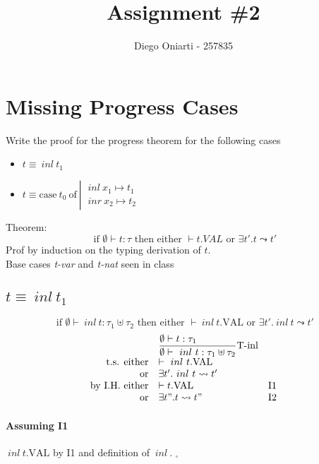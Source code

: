 \documentclass{article}
\title{Assignment \#2}
\author{Diego Oniarti - 257835}
\date{}
\newcommand{\st}[3][]{\ensuremath{\displaystyle\frac{#3\hfill}{#2\hfill} \text{#1}}}
\newcommand{\inl}[0]{\ensuremath{\ inl\ }}
\newcommand{\inr}[0]{\ensuremath{\ inr\ }}
\newcommand{\case}[3]{\ensuremath{\text{case}\ #1\ \text{of}\ \left|\begin{aligned}#2\\#3\end{aligned}\right.}}
\begin{document}
\maketitle

\section{Missing Progress Cases}
Write the proof for the progress theorem for the following cases
\begin{itemize}
    \item $t \equiv \inl t_1$
    \item $t \equiv \case{t_0}{\inl x_1 \mapsto t_1}{\inr x_2 \mapsto t_2}$
\end{itemize}

Theorem:
\[
    \text{ if } \emptyset \vdash t:\tau \text{ then either } \vdash t.VAL \text{ or } \exists t'.t\leadsto t'
\] 
Prof by induction on the typing derivation of $t$.\\
Base cases \textit{t-var} and \textit{t-nat} seen in class

\subsection{$t \equiv \inl t_1$}
\[
    \text{ if } \emptyset \vdash \inl t:\tau_1\uplus\tau_2 \text{ then either } \vdash \inl t.\text{VAL} \text{ or } \exists t'.\inl t\leadsto t'
\] 
\[
    \begin{array}{rl @{\quad} l}
                             &  \st[T-inl]{\emptyset\vdash \inl t: \tau_1\uplus\tau_2}{\emptyset\vdash t:\tau_1}  \\
        \text{t.s. either}   &   \vdash \inl t.\text{VAL} \\
        \text{or}            &   \exists t'.\inl t \leadsto t' \\
        \text{by I.H. either}&   \vdash t.\text{VAL}                 & \text{I1} \\
        \text{or}            &   \exists t".t \leadsto t"            & \text{I2} \\
    \end{array}
\]

\paragraph{Assuming I1}
$\inl t.\text{VAL}$ by I1 and definition of $\inl$. $_\square$
\end{document}
